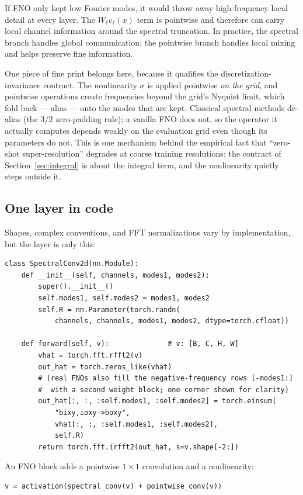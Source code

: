 \documentclass[10pt,a4paper]{article}
\begin{document}
If FNO only kept low Fourier modes, it would throw away high-frequency local
detail at every layer. The $W_\ell v_\ell(x)$ term is pointwise and therefore
can carry local channel information around the spectral truncation. In
practice, the spectral branch handles global communication; the pointwise
branch handles local mixing and helps preserve fine information.

One piece of fine print belongs here, because it qualifies the
discretization-invariance contract. The nonlinearity $\sigma$ is applied
pointwise \emph{on the grid}, and pointwise operations create frequencies
beyond the grid's Nyquist limit, which fold back --- alias --- onto the
modes that are kept. Classical spectral methods de-alias (the $3/2$
zero-padding rule); a vanilla FNO does not, so the operator it actually
computes depends weakly on the evaluation grid even though its parameters
do not. This is one mechanism behind the empirical fact that
``zero-shot super-resolution'' degrades at coarse training resolutions:
the contract of Section~\ref{sec:integral} is about the integral term, and
the nonlinearity quietly steps outside it.

\subsection{One layer in code}

Shapes, complex conventions, and FFT normalizations vary by implementation,
but the layer is only this:
\begin{lstlisting}
class SpectralConv2d(nn.Module):
    def __init__(self, channels, modes1, modes2):
        super().__init__()
        self.modes1, self.modes2 = modes1, modes2
        self.R = nn.Parameter(torch.randn(
            channels, channels, modes1, modes2, dtype=torch.cfloat))

    def forward(self, v):              # v: [B, C, H, W]
        vhat = torch.fft.rfft2(v)
        out_hat = torch.zeros_like(vhat)
        # (real FNOs also fill the negative-frequency rows [-modes1:]
        #  with a second weight block; one corner shown for clarity)
        out_hat[:, :, :self.modes1, :self.modes2] = torch.einsum(
            "bixy,ioxy->boxy",
            vhat[:, :, :self.modes1, :self.modes2],
            self.R)
        return torch.fft.irfft2(out_hat, s=v.shape[-2:])
\end{lstlisting}
An FNO block adds a pointwise $1\times1$ convolution and a nonlinearity:
\begin{lstlisting}
v = activation(spectral_conv(v) + pointwise_conv(v))
\end{lstlisting}
\end{document}
